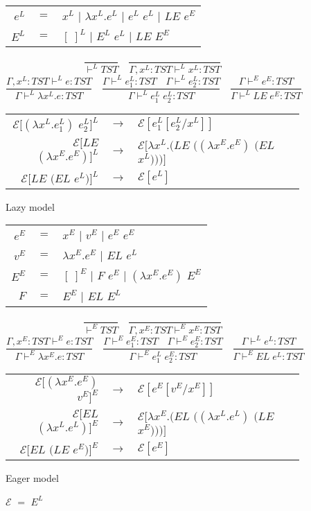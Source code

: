 \documentclass[12pt]{ucthesis}
\begin{document}
\begin{figure}[p]
\centering
\begin{tabular}{rcl}
$e^L$ & $=$ & $x^L$ $|$ $\lambda x^L.e^L$ $|$ $e^L$ $e^L$ $|$ $LE$ $e^E$ \\
$E^L$ & $=$ & $[\;]^L$ $|$ $E^L$ $e^L$ $|$ $LE$ $E^E$
\end{tabular}
\[
\frac{}{\vdash^LTST}
\quad
\frac{}{\Gamma,x^L:TST\vdash^Lx^L:TST}
\]
\[
\frac{\Gamma,x^L:TST\vdash^Le:TST}{\Gamma\vdash^L\lambda x^L.e:TST}
\quad
\frac{\Gamma\vdash^Le^L_1:TST\quad\Gamma\vdash^Le^L_2:TST}{\Gamma\vdash^Le^L_1\;e^L_2:TST}
\quad
\frac{\Gamma\vdash^Ee^E:TST}{\Gamma\vdash^LLE\;e^E:TST}
\]
\begin{tabular}{rcl}
$\mathscr{E}[(\lambda x^L.e^L_1)$ $e^L_2]^L$ & $\rightarrow$ & $\mathscr{E}[e^L_1[e^L_2/x^L]]$ \\
$\mathscr{E}[LE$ $(\lambda x^E.e^E)]^L$ & $\rightarrow$ & $\mathscr{E}[\lambda x^L.(LE$ $((\lambda x^E.e^E)$ $(EL$ $x^L)))]$ \\
$\mathscr{E}[LE$ $(EL$ $e^L)]^L$ & $\rightarrow$ & $\mathscr{E}[e^L]$
\end{tabular}
\caption{Lazy model}
\end{figure}

\begin{figure}[p]
\centering
\begin{tabular}{rcl}
$e^E$ & $=$ & $x^E$ $|$ $v^E$ $|$ $e^E$ $e^E$ \\
$v^E$ & $=$ & $\lambda x^E.e^E$ $|$ $EL$ $e^L$ \\
$E^E$ & $=$ & $[\;]^E$ $|$ $F$ $e^E$ $|$ $(\lambda x^E.e^E)$ $E^E$ \\
$F$ & $=$ & $E^E$ $|$ $EL$ $E^L$
\end{tabular}
\[
\frac{}{\vdash^ETST}
\quad
\frac{}{\Gamma,x^E:TST\vdash^Ex^E:TST}
\]
\[
\frac{\Gamma,x^E:TST\vdash^Ee:TST}{\Gamma\vdash^E\lambda x^E.e:TST}
\quad
\frac{\Gamma\vdash^Ee^E_1:TST\quad\Gamma\vdash^Ee^E_2:TST}{\Gamma\vdash^Ee^L_1\;e^E_2:TST}
\quad
\frac{\Gamma\vdash^Le^L:TST}{\Gamma\vdash^EEL\;e^L:TST}
\]
\begin{tabular}{rcl}
$\mathscr{E}[(\lambda x^E.e^E)$ $v^E]^E$ & $\rightarrow$ & $\mathscr{E}[e^E[v^E/x^E]]$ \\
$\mathscr{E}[EL$ $(\lambda x^L.e^L)]^E$ & $\rightarrow$ & $\mathscr{E}[\lambda x^E.(EL$ $((\lambda x^L.e^L)$ $(LE$ $x^E)))]$ \\
$\mathscr{E}[EL$ $(LE$ $e^E)]^E$ & $\rightarrow$ & $\mathscr{E}[e^E]$
\end{tabular}
\caption{Eager model}
\end{figure}

\begin{figure}[p]
\centering
$\mathscr{E}$ $=$ $E^L$
\end{figure}
\end{document}
